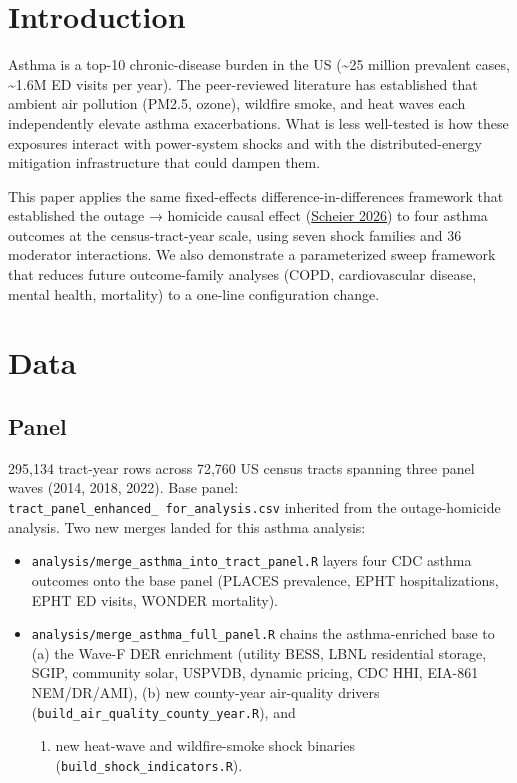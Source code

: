 \documentclass[
]{article}
\providecommand{\tightlist}{%
  \setlength{\itemsep}{0pt}\setlength{\parskip}{0pt}}
\begin{document}
\hypertarget{introduction}{%
\section{Introduction}\label{introduction}}

Asthma is a top-10 chronic-disease burden in the US (\textasciitilde25
million prevalent cases, \textasciitilde1.6M ED visits per year). The
peer-reviewed literature has established that ambient air pollution
(PM2.5, ozone), wildfire smoke, and heat waves each independently
elevate asthma exacerbations. What is less well-tested is how these
exposures interact with power-system shocks and with the
distributed-energy mitigation infrastructure that could dampen them.

This paper applies the same fixed-effects difference-in-differences
framework that established the outage → homicide causal effect
(\protect\hyperlink{ref-ScheierOutageHomicide2026}{Scheier 2026}) to
four asthma outcomes at the census-tract-year scale, using seven shock
families and 36 moderator interactions. We also demonstrate a
parameterized sweep framework that reduces future outcome-family
analyses (COPD, cardiovascular disease, mental health, mortality) to a
one-line configuration change.

\hypertarget{data}{%
\section{Data}\label{data}}

\hypertarget{panel}{%
\subsection{Panel}\label{panel}}

295,134 tract-year rows across 72,760 US census tracts spanning three
panel waves (2014, 2018, 2022). Base panel:
\texttt{tract\_panel\_enhanced\_\ for\_analysis.csv} inherited from the
outage-homicide analysis. Two new merges landed for this asthma
analysis:

\begin{itemize}
\tightlist
\item
  \texttt{analysis/merge\_asthma\_into\_tract\_panel.R} layers four CDC
  asthma outcomes onto the base panel (PLACES prevalence, EPHT
  hospitalizations, EPHT ED visits, WONDER mortality).
\item
  \texttt{analysis/merge\_asthma\_full\_panel.R} chains the
  asthma-enriched base to (a) the Wave-F DER enrichment (utility BESS,
  LBNL residential storage, SGIP, community solar, USPVDB, dynamic
  pricing, CDC HHI, EIA-861 NEM/DR/AMI), (b) new county-year air-quality
  drivers (\texttt{build\_air\_quality\_county\_year.R}), and

  \begin{enumerate}
  \def\labelenumi{(\alph{enumi})}
  \setcounter{enumi}{2}
  \tightlist
  \item
    new heat-wave and wildfire-smoke shock binaries
    (\texttt{build\_shock\_indicators.R}).
  \end{enumerate}
\end{itemize}
\end{document}

